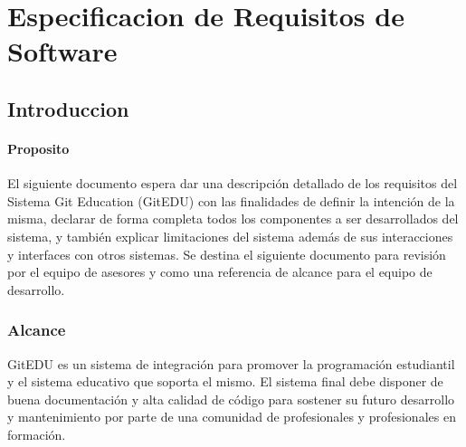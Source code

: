 

\chapter{Especificacion de Requisitos de Software}
\label{ersDoc}

\section{Introduccion}

\subsubsection{Proposito}
El siguiente documento espera dar una descripción detallado de los requisitos del Sistema Git Education (GitEDU) con las finalidades de definir la intención de la misma, declarar de forma completa todos los componentes a ser desarrollados del sistema, y también explicar limitaciones del sistema además de sus interacciones y interfaces con otros sistemas. Se destina el siguiente documento para revisión por el equipo de asesores y como una referencia de alcance para el equipo de desarrollo.

\subsection{Alcance}
GitEDU es un sistema de integración para promover la programación estudiantil y el sistema educativo que soporta el mismo. El sistema final debe disponer de buena documentación y alta calidad de código para sostener su futuro desarrollo y mantenimiento por parte de una comunidad de profesionales y profesionales en formación.

